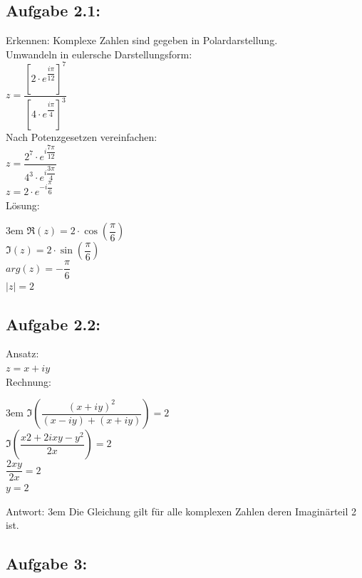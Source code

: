 \documentclass[11pt,final]{scrreprt}
\newcommand{\br} {\medskip\\}
\newcommand{\gbr} {\bigskip\\}
\begin{document}
\subsection*{Aufgabe 2.1:}

Erkennen: Komplexe Zahlen sind gegeben in Polardarstellung.\\
Umwandeln in eulersche Darstellungsform:\\
\hspace*{3em} $ z = \dfrac{\left[  2\cdot e^{\dfrac{i\pi}{12}}\right]^7}{\left[  4\cdot e^{\dfrac{i\pi}{4}}\right]^3} $\br
Nach Potenzgesetzen vereinfachen:\\
\hspace*{3em} $ z = \dfrac{  2^7\cdot e^{i\dfrac{7\pi}{12}}}{4^3\cdot e^{i\dfrac{3\pi}{4}}} $\\
\hspace*{3em} $ z =  2\cdot e^{-i\dfrac{\pi}{6}} $\gbr
Lösung:

\begingroup
\leftskip3em 
$ \Re(z) = 2\cdot\cos(\dfrac{\pi}{6}) $\\
$ \Im(z) = 2\cdot\sin(\dfrac{\pi}{6}) $\\
$ arg(z) = -\dfrac{\pi}{6} $\\
$ | z |  = 2 $
\par	
\endgroup 

\subsection*{Aufgabe 2.2:}
Ansatz:\\
\hspace*{3em}$z=x+iy$\br
Rechnung:

\begingroup
\leftskip3em 
$ \Im\left( \dfrac{(x+iy)^2}{(x-iy)+(x+iy)} \right) = 2 $\\
$ \Im\left( \dfrac{x2+2ixy-y^2}{2x} \right) = 2 $\\
$ \dfrac{2xy}{2x} = 2 $\\
$ y = 2$\\
\par	
\endgroup 

Antwort:
\begingroup
\leftskip3em 
Die Gleichung gilt für alle komplexen Zahlen deren Imaginärteil 2 ist.\\
\par	
\endgroup 

\subsection*{Aufgabe 3:}
\end{document}
